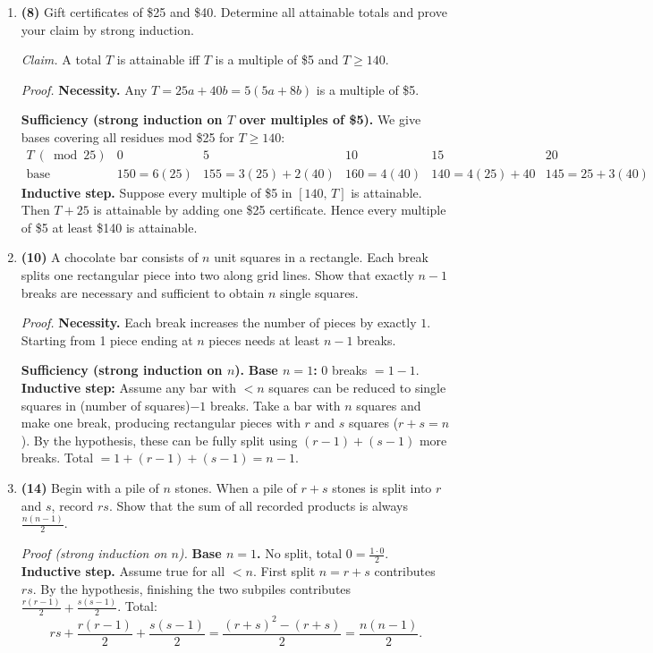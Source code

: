 \documentclass[11pt]{article}
\newcommand{\ds}{\displaystyle}
\begin{document}
\begin{enumerate}[label=\textbf{\arabic*.},resume]

\item \textbf{(8)} Gift certificates of \$25 and \$40. Determine all attainable totals and prove your claim by strong induction.

\textit{Claim.} A total $T$ is attainable iff $T$ is a multiple of \$5 and $T\ge 140$.

\textit{Proof.}
\textbf{Necessity.} Any $T=25a+40b=5(5a+8b)$ is a multiple of \$5.

\textbf{Sufficiency (strong induction on $T$ over multiples of \$5).}
We give bases covering all residues mod \$25 for $T\ge 140$:
\[
\begin{array}{c|ccccc}
T\ (\bmod 25) & 0 & 5 & 10 & 15 & 20\\\hline
\text{base} & 150=6(25) & 155=3(25)+2(40) & 160=4(40) & 140=4(25)+40 & 145=25+3(40)
\end{array}
\]
\textbf{Inductive step.} Suppose every multiple of \$5 in $[140,\,T]$ is attainable. Then $T+25$ is attainable by adding one \$25 certificate. Hence every multiple of \$5 at least \$140 is attainable. 

\bigskip

\item \textbf{(10)} A chocolate bar consists of $n$ unit squares in a rectangle. Each break splits one rectangular piece into two along grid lines. Show that exactly $n-1$ breaks are necessary and sufficient to obtain $n$ single squares.

\textit{Proof.}
\textbf{Necessity.} Each break increases the number of pieces by exactly $1$. Starting from 1 piece ending at $n$ pieces needs at least $n-1$ breaks.

\textbf{Sufficiency (strong induction on $n$).}
\textbf{Base $n=1$:} 0 breaks $=1-1$.  
\textbf{Inductive step:} Assume any bar with $<n$ squares can be reduced to single squares in (number of squares)$-1$ breaks. Take a bar with $n$ squares and make one break, producing rectangular pieces with $r$ and $s$ squares ($r+s=n$). By the hypothesis, these can be fully split using $(r-1)+(s-1)$ more breaks. Total $=1+(r-1)+(s-1)=n-1$. 

\bigskip

\item \textbf{(14)} Begin with a pile of $n$ stones. When a pile of $r+s$ stones is split into $r$ and $s$, record $rs$. Show that the sum of all recorded products is always $\ds \frac{n(n-1)}{2}$.

\textit{Proof (strong induction on $n$).}
\textbf{Base $n=1$.} No split, total $0=\frac{1\cdot0}{2}$.  
\textbf{Inductive step.} Assume true for all $<n$. First split $n=r+s$ contributes $rs$. By the hypothesis, finishing the two subpiles contributes $\frac{r(r-1)}{2}+\frac{s(s-1)}{2}$. Total:
\[
rs+\frac{r(r-1)}{2}+\frac{s(s-1)}{2}
=\frac{(r+s)^2-(r+s)}{2}
=\frac{n(n-1)}{2}.
\]


\end{enumerate}
\end{document}

